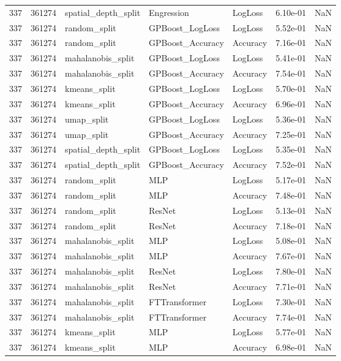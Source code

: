 \begin{tabular}{rrlllrr}
337 & 361274 & spatial\_depth\_split & Engression & LogLoss & 6.10e-01 & NaN \\
337 & 361274 & random\_split & GPBoost\_LogLoss & LogLoss & 5.52e-01 & NaN \\
337 & 361274 & random\_split & GPBoost\_Accuracy & Accuracy & 7.16e-01 & NaN \\
337 & 361274 & mahalanobis\_split & GPBoost\_LogLoss & LogLoss & 5.41e-01 & NaN \\
337 & 361274 & mahalanobis\_split & GPBoost\_Accuracy & Accuracy & 7.54e-01 & NaN \\
337 & 361274 & kmeans\_split & GPBoost\_LogLoss & LogLoss & 5.70e-01 & NaN \\
337 & 361274 & kmeans\_split & GPBoost\_Accuracy & Accuracy & 6.96e-01 & NaN \\
337 & 361274 & umap\_split & GPBoost\_LogLoss & LogLoss & 5.36e-01 & NaN \\
337 & 361274 & umap\_split & GPBoost\_Accuracy & Accuracy & 7.25e-01 & NaN \\
337 & 361274 & spatial\_depth\_split & GPBoost\_LogLoss & LogLoss & 5.35e-01 & NaN \\
337 & 361274 & spatial\_depth\_split & GPBoost\_Accuracy & Accuracy & 7.52e-01 & NaN \\
337 & 361274 & random\_split & MLP & LogLoss & 5.17e-01 & NaN \\
337 & 361274 & random\_split & MLP & Accuracy & 7.48e-01 & NaN \\
337 & 361274 & random\_split & ResNet & LogLoss & 5.13e-01 & NaN \\
337 & 361274 & random\_split & ResNet & Accuracy & 7.18e-01 & NaN \\
337 & 361274 & mahalanobis\_split & MLP & LogLoss & 5.08e-01 & NaN \\
337 & 361274 & mahalanobis\_split & MLP & Accuracy & 7.67e-01 & NaN \\
337 & 361274 & mahalanobis\_split & ResNet & LogLoss & 7.80e-01 & NaN \\
337 & 361274 & mahalanobis\_split & ResNet & Accuracy & 7.71e-01 & NaN \\
337 & 361274 & mahalanobis\_split & FTTransformer & LogLoss & 7.30e-01 & NaN \\
337 & 361274 & mahalanobis\_split & FTTransformer & Accuracy & 7.74e-01 & NaN \\
337 & 361274 & kmeans\_split & MLP & LogLoss & 5.77e-01 & NaN \\
337 & 361274 & kmeans\_split & MLP & Accuracy & 6.98e-01 & NaN \\

\end{tabular}

